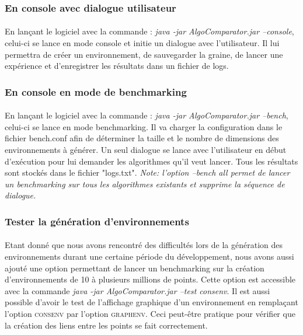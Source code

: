 \documentclass[pidr]{tnreport}
\begin{document}
			\subsubsection{En console avec dialogue utilisateur}

\paragraph{}
En lançant le logiciel avec la commande : \emph{java -jar AlgoComparator.jar --console}, celui-ci se lance en mode console et initie un dialogue avec l'utilisateur. Il lui permettra de créer un environnement, de sauvegarder la graine, de lancer une expérience et d'enregistrer les résultats dans un fichier de logs.

			\subsubsection{En console en mode de benchmarking}
			
\paragraph{}
En lançant le logiciel avec la commande : \emph{java -jar AlgoComparator.jar --bench}, celui-ci se lance en mode benchmarking. Il va charger la configuration dans le fichier bench.conf afin de déterminer la taille et le nombre de dimensions des environnements à générer. Un seul dialogue se lance avec l'utilisateur en début d'exécution pour lui demander les algorithmes qu'il veut lancer. Tous les résultats sont stockés dans le fichier "logs.txt". \linebreak
\emph{Note: l'option --bench all permet de lancer un benchmarking sur tous les algorithmes existants et supprime la séquence de dialogue.}
			
			\subsubsection{Tester la génération d'environnements}

\paragraph{}
Etant donné que nous avons rencontré des difficultés lors de la génération des environnements durant une certaine période du développement, nous avons aussi ajouté une option permettant de lancer un benchmarking sur la création d'environnements de 10 à plusieurs millions de points. Cette option est accessible avec la commande \emph{java -jar AlgoComparator.jar --test consenv}. \linebreak
Il est aussi possible d'avoir le test de l'affichage graphique d'un environnement en remplaçant l'option \textsc{consenv} par l'option \textsc{graphenv}. Ceci peut-être pratique pour vérifier que la création des liens entre les points se fait correctement.
\end{document}
